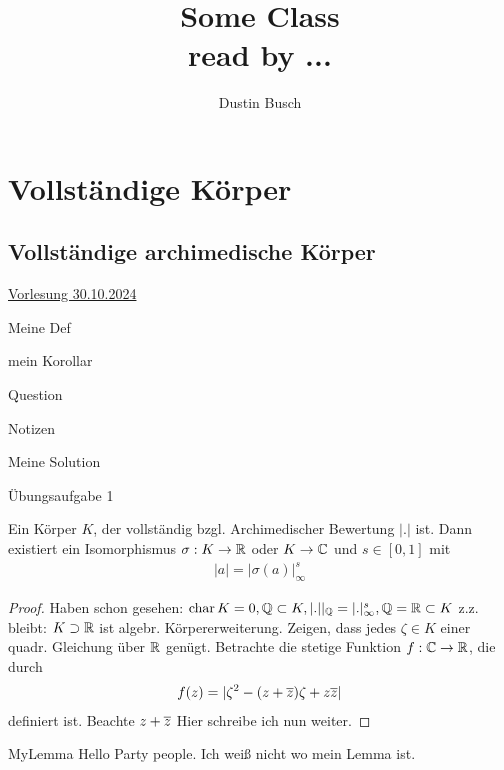 \documentclass{report}
\title{\Huge{Some Class}\\read by ...}
\author{\huge{Dustin Busch}}
\date{}
\begin{document}
\maketitle
\newpage
\tableofcontents
\pagebreak 

\chapter{Vollständige Körper}
\section{Vollständige archimedische Körper}
\underline{Vorlesung 30.10.2024}
\begin{definition}{Meine Def}{}
	
\end{definition}

\begin{corollary}{mein Korollar}{}
	
\end{corollary}

\begin{question}{Question}{}

\end{question}

\begin{note}{Notizen}{}
	
\end{note}

\begin{solution}{Meine Solution}{}
	
\end{solution}

\begin{exercise}{Übungsaufgabe 1}{}
	
\end{exercise}

\begin{theorem}{}{}
	Ein Körper $K$, der vollständig bzgl. Archimedischer Bewertung $|.|$ ist. Dann existiert ein Isomorphismus $\sigma: K\to\mathbb{R}$ oder $K\to\mathbb{C}$ und $s\in[0,1]$ mit 
	\begin{align*}
		|a| = |\sigma(a)|^s_\infty
	\end{align*}	
\end{theorem}
\begin{proof}
	Haben schon gesehen: $\operatorname{char} K = 0, \mathbb{Q} \subset K, |.||_{\mathbb{Q}} = |.|_\infty^s, \mathbb{Q} = \mathbb{R} \subset K $ 
	z.z. bleibt: $K \supset \mathbb{R}$ ist algebr. Körpererweiterung.
	Zeigen, dass jedes $\zeta\in K$ einer quadr. Gleichung über $\mathbb{R}$ genügt. Betrachte die stetige Funktion $f: \mathbb{C}\to\mathbb{R}$, die durch 
	\begin{align*}
		f(z) = |\zeta^2 - (z + \overline{z})\zeta + z\overline{z}| 
	\end{align*}
	definiert ist. Beachte $z + \overline{z}$ 
	Hier schreibe ich nun weiter.
\end{proof}
\begin{lemma}{MyLemma}{}
	Hello Party people. Ich weiß nicht wo mein Lemma ist.
\end{lemma}
\end{document}
